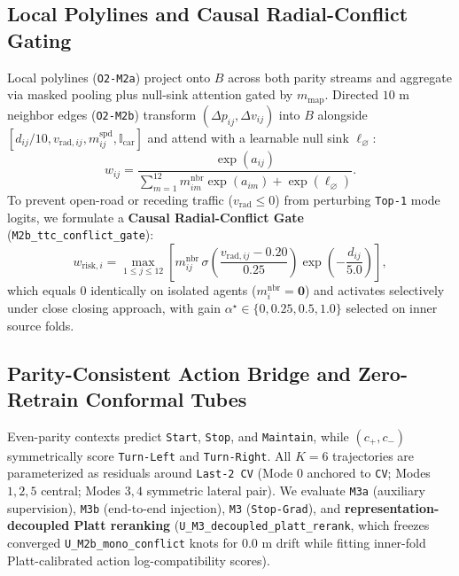 \documentclass[journal]{IEEEtran}
\begin{document}
\subsection{Local Polylines and Causal Radial-Conflict Gating}
Local polylines (\texttt{O2-M2a}) project onto $B$ across both parity streams and aggregate via masked pooling plus null-sink attention gated by $m_{\text{map}}$. Directed $10\text{ m}$ neighbor edges (\texttt{O2-M2b}) transform $(\Delta p_{ij}, \Delta v_{ij})$ into $B$ alongside $[d_{ij}/10, v_{\text{rad}, ij}, m^{\text{spd}}_{ij}, \mathbb{I}_{\text{car}}]$ and attend with a learnable null sink $\ell_\varnothing$:
\begin{equation}
  w_{ij} = \frac{\exp(a_{ij})}{\sum_{m=1}^{12} m^{\text{nbr}}_{im}\exp(a_{im}) + \exp(\ell_\varnothing)}.
  \label{eq:null_sink}
\end{equation}
To prevent open-road or receding traffic ($v_{\text{rad}} \le 0$) from perturbing \texttt{Top-1} mode logits, we formulate a \textbf{Causal Radial-Conflict Gate} (\texttt{M2b\_ttc\_conflict\_gate}):
\begin{equation}
  w_{\text{risk}, i} = \max_{1 \le j \le 12} \left[ m^{\text{nbr}}_{ij} \, \sigma\!\left(\frac{v_{\text{rad}, ij} - 0.20}{0.25}\right) \exp\!\left(-\frac{d_{ij}}{5.0}\right) \right],
  \label{eq:conflict_gate}
\end{equation}
which equals $0$ identically on isolated agents ($m^{\text{nbr}}_i = \mathbf{0}$) and activates selectively under close closing approach, with gain $\alpha^\star \in \{0, 0.25, 0.5, 1.0\}$ selected on inner source folds.

\subsection{Parity-Consistent Action Bridge and Zero-Retrain Conformal Tubes}
Even-parity contexts predict \texttt{Start}, \texttt{Stop}, and \texttt{Maintain}, while $(c_+, c_-)$ symmetrically score \texttt{Turn-Left} and \texttt{Turn-Right}. All $K=6$ trajectories are parameterized as residuals around \texttt{Last-2 CV} (Mode $0$ anchored to \texttt{CV}; Modes $1,2,5$ central; Modes $3,4$ symmetric lateral pair). We evaluate \texttt{M3a} (auxiliary supervision), \texttt{M3b} (end-to-end injection), \texttt{M3} (\texttt{Stop-Grad}), and \textbf{representation-decoupled Platt reranking} (\texttt{U\_M3\_decoupled\_platt\_rerank}, which freezes converged \texttt{U\_M2b\_mono\_conflict} knots for $0.0\text{ m}$ drift while fitting inner-fold Platt-calibrated action log-compatibility scores).
\end{document}
